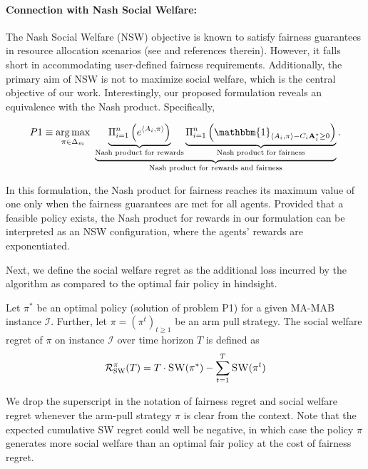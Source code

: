 \paragraph{Connection with Nash Social Welfare:} The Nash Social Welfare (NSW) objective is known to satisfy fairness guarantees in resource allocation scenarios (see \cite{Hossain2020FairAF, caragiannis2019unreasonable} and references therein). However, it falls short in accommodating user-defined fairness requirements. Additionally, the primary aim of NSW is not to maximize social welfare, which is the central objective of our work. Interestingly, our proposed formulation reveals an equivalence with the Nash product. Specifically, 

\begin{align*}
P1 \equiv \argmax_{\pi\in\Delta_m}\ \underbrace{\underbrace{\Pi_{i=1}^n\left( e^{\langle A_i, \pi\rangle} \right)}_{\textup{Nash product for rewards}} \underbrace{\Pi_{i=1}^n\left( \mathbbm{1}_{\langle A_i,\pi\rangle-C_i\Amax_i\geq 0} \right) }_{\textup{Nash product for fairness}}}_{\textup{Nash product for rewards and fairness}}.
\end{align*}

In this formulation, the Nash product for fairness reaches its maximum value of one only when the fairness guarantees are met for all agents. Provided that a feasible policy exists, the Nash product for rewards in our formulation can be interpreted as an NSW configuration, where the agents' rewards are exponentiated. 

Next,  we define the social welfare regret as the additional loss incurred by the algorithm as compared to the optimal fair policy in hindsight.


\begin{definition}
Let  $\pi^*$ be an optimal policy (solution of problem P1) for a given MA-MAB instance $\mathcal{I}$.  Further, let  $\pi = (\pi^t)_{t\geq 1}$ be an arm pull strategy. The social welfare regret of $\pi$ on instance $\mathcal{I}$ over time horizon $T$ is defined as  
\begin{equation}
\mathcal{R}_\textsc{SW}^\pi (T) =  T \cdot  \textsc{SW}(\pi^*) - \sum_{t=1}^T \textsc{SW}(\pi^t)  
\end{equation}
\end{definition}

We drop the superscript in the notation of fairness regret and social welfare regret  whenever the arm-pull strategy  $\pi$ is clear from the context. Note that the expected cumulative SW regret could well  be negative, in which case the policy $\pi$ generates more social welfare than an optimal fair policy at the cost of fairness regret. %







